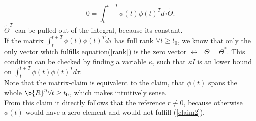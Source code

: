 \documentclass[12pt,a4paper]{article}
\begin{document}
	\begin{equation}
	\label{rank}
	0 = \int_t^{t+T} \phi(t) \phi(t)^T d\tau \tilde{\Theta}.
	\end{equation}
	$\tilde{\Theta}^T$ can be pulled out of the integral, because its constant.\\
	If the matrix  $\int_t^{t+T} \phi(t) \phi(t)^T d\tau$ has full rank $\forall t\geq t_0$, we know that only the only vector which fulfills equation(\ref{rank}) is the zero vector $\leftrightarrow \text{ } \Theta = \Theta^*$.
        This condition can be checked by finding a variable $\kappa$, such that $\kappa I$ is an lower bound on $\int_t^{t+T} \phi(t) \phi(t)^T d\tau$.\\
        Note that the matrix-claim is equivalent to the claim, that $\phi(t)$ spans the whole $\b{R}^n \forall t \geq t_0$, which makes intuitively sense.\\
        From this claim it directly follows that the reference $r \not\equiv 0$, because otherwise $\phi(t)$ would have a zero-element and would not fulfill (\ref{claim2}).
\end{document}
